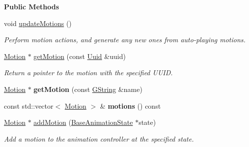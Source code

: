 \begin{Indent}\textbf{ Public Methods}\par
\begin{DoxyCompactItemize}
\item 
\mbox{\label{classrev_1_1_animation_controller_a66a54baf2621ab20189d6c0ff932fed8}} 
void \mbox{\hyperlink{classrev_1_1_animation_controller_a66a54baf2621ab20189d6c0ff932fed8}{update\+Motions}} ()
\begin{DoxyCompactList}\small\item\em Perform motion actions, and generate any new ones from auto-\/playing motions. \end{DoxyCompactList}\item 
\mbox{\label{classrev_1_1_animation_controller_ae7176279fcdec559eee67209dfc41a03}} 
\mbox{\hyperlink{classrev_1_1_motion}{Motion}} $\ast$ \mbox{\hyperlink{classrev_1_1_animation_controller_ae7176279fcdec559eee67209dfc41a03}{get\+Motion}} (const \mbox{\hyperlink{classrev_1_1_uuid}{Uuid}} \&uuid)
\begin{DoxyCompactList}\small\item\em Return a pointer to the motion with the specified U\+U\+ID. \end{DoxyCompactList}\item 
\mbox{\label{classrev_1_1_animation_controller_a5fdf99c4622fbed284645f659e1b6546}} 
\mbox{\hyperlink{classrev_1_1_motion}{Motion}} $\ast$ {\bfseries get\+Motion} (const \mbox{\hyperlink{classrev_1_1_g_string}{G\+String}} \&name)
\item 
\mbox{\label{classrev_1_1_animation_controller_a0fc355e7ef900e2d469871dc8f58b074}} 
const std\+::vector$<$ \mbox{\hyperlink{classrev_1_1_motion}{Motion}} $>$ \& {\bfseries motions} () const
\item 
\mbox{\label{classrev_1_1_animation_controller_a87acb2a03bd2c916f40a53f5c29aa359}} 
\mbox{\hyperlink{classrev_1_1_motion}{Motion}} $\ast$ \mbox{\hyperlink{classrev_1_1_animation_controller_a87acb2a03bd2c916f40a53f5c29aa359}{add\+Motion}} (\mbox{\hyperlink{classrev_1_1_base_animation_state}{Base\+Animation\+State}} $\ast$state)
\begin{DoxyCompactList}\small\item\em Add a motion to the animation controller at the specified state. \end{DoxyCompactList}\item 

\end{DoxyCompactItemize}
\end{Indent}
